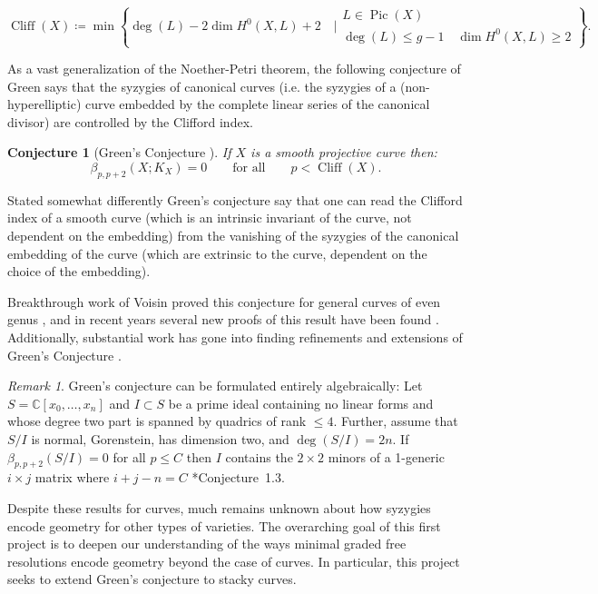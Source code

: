 \documentclass[11pt,reqno]{amsart}
\newtheorem{conj}[lemma]{Conjecture}
\theoremstyle{remark}
\newtheorem{remark}[lemma]{Remark}
\newcommand{\Pic}{\operatorname{Pic}}
\newcommand{\cliff}{\operatorname{Cliff}}
\newcommand{\C}{\mathbb{C}}
\begin{document}
\[
\cliff(X)\coloneqq \min \left\{\deg(L) - 2 \dim H^{0}(X,L)+2 \quad \bigg| \begin{matrix} L\in \Pic(X) \\
\deg(L)\leq g-1 \quad \dim H^0(X,L)\geq2\end{matrix}\right\}.
\]

As a vast generalization of the Noether-Petri theorem, the following conjecture of Green says that the syzygies of canonical curves (i.e. the syzygies of a (non-hyperelliptic) curve embedded by the complete linear series of the canonical divisor) are controlled by the Clifford index.


\begin{conj}[Green's Conjecture \cite{green84-I}]
	If $X$ is a smooth projective curve then:
	\[
	\beta_{p,p+2}(X;K_X)=0 \quad \quad \text{for all} \quad \quad p<\cliff(X).
	\]
\end{conj}

Stated somewhat differently Green's conjecture say that one can read the Clifford index of a smooth curve (which is an intrinsic invariant of the curve, not dependent on the embedding) from the vanishing of the syzygies of the canonical embedding of the curve (which are extrinsic to the curve, dependent on the choice of the embedding). 

Breakthrough work of Voisin proved this conjecture for general curves of even genus \cite{voisin02,voisin05}, and in recent years several new proofs of this result have been found \cite{aproduFarkas19,kemeny21}. Additionally, substantial work has gone into finding refinements and extensions of Green's Conjecture \cite{farkasMustataPopa03,chiodoEFS13,farkasKemeny16,farkasKemeny17,deopurkar18}.

\begin{remark}
Green's conjecture can be formulated entirely algebraically: Let $S=\C[x_{0},\ldots,x_{n}]$ and $I\subset S$ be a prime ideal containing no linear forms and whose degree two part is spanned by quadrics of rank $\leq 4$. Further, assume that $S/I$ is normal, Gorenstein, has dimension two, and $\deg(S/I)=2n$. If $\beta_{p,p+2}(S/I)=0$ for all $p\leq C$ then $I$ contains the $2\times2$ minors of a 1-generic $i\times j$ matrix where $i+j-n=C$ \cite{eisenbud92}*{Conjecture~1.3}.
\end{remark}


Despite these results for curves, much remains unknown about how syzygies encode geometry for other types of varieties. The overarching goal of this first project is to deepen our understanding of the ways minimal graded free resolutions encode geometry beyond the case of curves. In particular, this project seeks to extend Green's conjecture to stacky curves.
\end{document}
